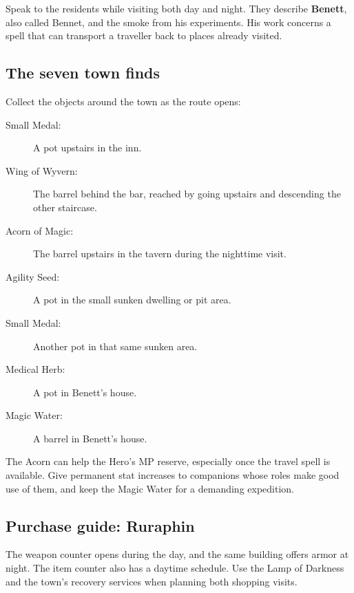 Speak to the residents while visiting both day and night. They describe
\textbf{Benett}, also called Bennet, and the smoke from his experiments.
His work concerns a spell that can transport a traveller back to places
already visited.

\subsection*{The seven town finds}

Collect the objects around the town as the route opens:
\begin{description}
  \item[Small Medal:] A pot upstairs in the inn.
  \item[Wing of Wyvern:] The barrel behind the bar, reached by going
    upstairs and descending the other staircase.
  \item[Acorn of Magic:] The barrel upstairs in the tavern during
    the nighttime visit.
  \item[Agility Seed:] A pot in the small sunken dwelling or pit area.
  \item[Small Medal:] Another pot in that same sunken area.
  \item[Medical Herb:] A pot in Benett's house.
  \item[Magic Water:] A barrel in Benett's house.
\end{description}

The Acorn can help the Hero's MP reserve, especially once the travel
spell is available. Give permanent stat increases to companions whose
roles make good use of them, and keep the Magic Water for a demanding
expedition.

\subsection*{Purchase guide: Ruraphin}

The weapon counter opens during the day, and the same building offers
armor at night. The item counter also has a daytime schedule. Use the
Lamp of Darkness and the town's recovery services when planning both
shopping visits.

